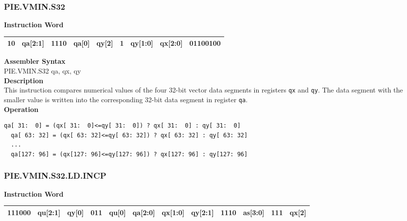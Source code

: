 \newpage
\subsubsection{PIE.VMIN.S32}\label{instruction:PIEVMINS32}
\setlength\tabcolsep{6pt}
\textbf{Instruction Word} \\
\begin{tabular}{|c|c|c|c|c|c|c|c|c|}
	\hline
	10 & qa[2:1] & 1110 & qa[0] & qy[2] & 1 & qy[1:0] & qx[2:0] & 01100100 \\
	\hline
\end{tabular}

\textbf{Assembler Syntax} \\
PIE.VMIN.S32 qa, qx, qy \\
\textbf{Description} \\
This instruction compares numerical values of the four 32-bit vector data segments in registers \lstinline{qx} and \lstinline{qy}. The data segment with the smaller value is written into the corresponding 32-bit data segment in register \lstinline{qa}.\\
\textbf{Operation}
\begin{lstlisting}[escapeinside=`?]
  qa[ 31:  0] = (qx[ 31:  0]<=qy[ 31:  0]) ? qx[ 31:  0] : qy[ 31:  0]
  qa[ 63: 32] = (qx[ 63: 32]<=qy[ 63: 32]) ? qx[ 63: 32] : qy[ 63: 32]
  ...
  qa[127: 96] = (qx[127: 96]<=qy[127: 96]) ? qx[127: 96] : qy[127: 96]
\end{lstlisting}

\newpage
\subsubsection{PIE.VMIN.S32.LD.INCP}\label{instruction:PIEVMINS32LDINCP}
\setlength\tabcolsep{6pt}
\textbf{Instruction Word} \\
\begin{tabular}{|c|c|c|c|c|c|c|c|c|c|c|c|}
	\hline
	111000 & qu[2:1] & qy[0] & 011 & qu[0] & qa[2:0] & qx[1:0] & qy[2:1] & 1110 & as[3:0] & 111 & qx[2] \\
	\hline
\end{tabular}

